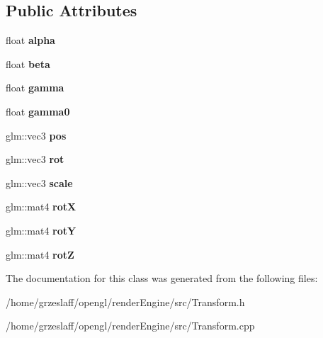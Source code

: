 \subsection*{Public Attributes}
\begin{DoxyCompactItemize}
\item 
\hypertarget{classTransform_aebe7b0ab29eb8bff963e0b63de1c0d89}{float {\bfseries alpha}}\label{classTransform_aebe7b0ab29eb8bff963e0b63de1c0d89}

\item 
\hypertarget{classTransform_a23a52bd1599ee3c1f83937cd5d88d3ba}{float {\bfseries beta}}\label{classTransform_a23a52bd1599ee3c1f83937cd5d88d3ba}

\item 
\hypertarget{classTransform_a935a011b2c0f9d738035c33b54d25fa7}{float {\bfseries gamma}}\label{classTransform_a935a011b2c0f9d738035c33b54d25fa7}

\item 
\hypertarget{classTransform_a705718a8a869c77def4f85cdc30ef387}{float {\bfseries gamma0}}\label{classTransform_a705718a8a869c77def4f85cdc30ef387}

\item 
\hypertarget{classTransform_ac266b39e41cf2c61eb3961ac47baa9b4}{glm\-::vec3 {\bfseries pos}}\label{classTransform_ac266b39e41cf2c61eb3961ac47baa9b4}

\item 
\hypertarget{classTransform_a802363b8bba9753ef6180099bb101f4b}{glm\-::vec3 {\bfseries rot}}\label{classTransform_a802363b8bba9753ef6180099bb101f4b}

\item 
\hypertarget{classTransform_acf6ab53778448fd2f2d8a367c14e7f95}{glm\-::vec3 {\bfseries scale}}\label{classTransform_acf6ab53778448fd2f2d8a367c14e7f95}

\item 
\hypertarget{classTransform_a07cfc6577e75c1d4edb3092d8d5a2928}{glm\-::mat4 {\bfseries rot\-X}}\label{classTransform_a07cfc6577e75c1d4edb3092d8d5a2928}

\item 
\hypertarget{classTransform_a3e21aa6e5bb973038981f1340ea753bf}{glm\-::mat4 {\bfseries rot\-Y}}\label{classTransform_a3e21aa6e5bb973038981f1340ea753bf}

\item 
\hypertarget{classTransform_ae4fcb60a284c43f7c48bfa6226247285}{glm\-::mat4 {\bfseries rot\-Z}}\label{classTransform_ae4fcb60a284c43f7c48bfa6226247285}

\end{DoxyCompactItemize}


The documentation for this class was generated from the following files\-:\begin{DoxyCompactItemize}
\item 
/home/grzeslaff/opengl/render\-Engine/src/Transform.\-h\item 
/home/grzeslaff/opengl/render\-Engine/src/Transform.\-cpp\end{DoxyCompactItemize}
